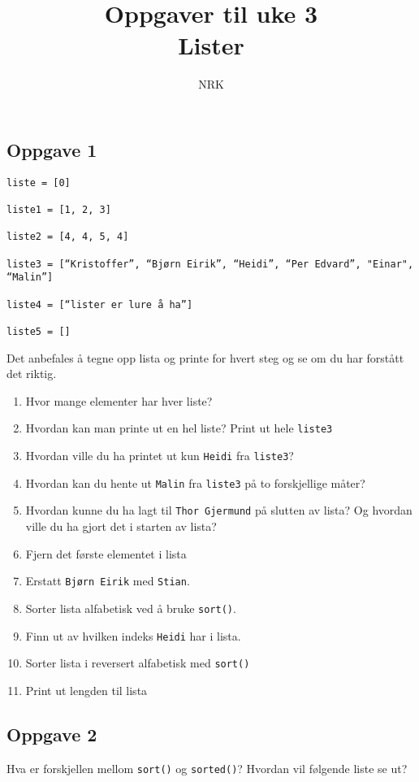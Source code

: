 \documentclass{article}
\title{Oppgaver til uke 3 \\ Lister}
\author{NRK}
\date{}
\begin{document}
\maketitle
\noindent

\subsection*{Oppgave 1}
\begin{verbatim}
liste = [0]

liste1 = [1, 2, 3]

liste2 = [4, 4, 5, 4]

liste3 = [“Kristoffer”, “Bjørn Eirik”, “Heidi”, “Per Edvard”, "Einar", “Malin”]

liste4 = [“lister er lure å ha”]

liste5 = []  
\end{verbatim}
Det anbefales å tegne opp lista og printe for hvert steg og se om du har forstått det riktig.
\begin{enumerate}
    \item Hvor mange elementer har hver liste?
    \item Hvordan kan man printe ut en hel liste? Print ut hele \texttt{liste3}
    \item Hvordan ville du ha printet ut kun \texttt{Heidi} fra \texttt{liste3}?
    \item Hvordan kan du hente ut \texttt{Malin} fra  \texttt{liste3} på to forskjellige måter?
    \item Hvordan kunne du ha lagt til \texttt{Thor Gjermund} på slutten av lista? Og hvordan ville du ha gjort det i starten av lista?
    \item Fjern det første elementet i lista
    \item Erstatt \texttt{Bjørn Eirik} med \texttt{Stian}.
    \item Sorter lista alfabetisk ved å bruke \texttt{sort()}.
    \item Finn ut av hvilken indeks \texttt{Heidi} har i lista.
    \item Sorter lista i reversert alfabetisk med \texttt{sort()}
    \item Print ut lengden til lista
\end{enumerate}

\subsection*{Oppgave 2}
Hva er forskjellen mellom \texttt{sort()} og \texttt{sorted()}? Hvordan vil følgende liste se ut?
\end{document}
